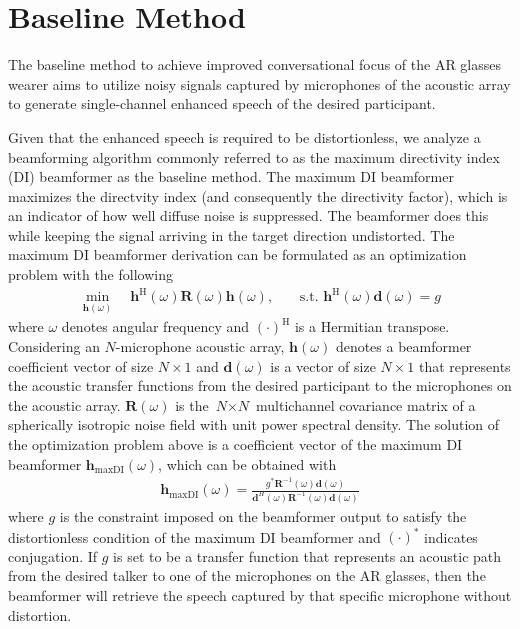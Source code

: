 \documentclass[journal]{IEEEtran}
\begin{document}
 \section{Baseline Method} \label{sec:BaselineMethod}

The baseline method to achieve improved conversational focus of the AR glasses wearer aims to utilize noisy signals captured by microphones of the acoustic array to generate single-channel enhanced speech of the desired participant.


Given that the enhanced speech is required to be distortionless,
we analyze a beamforming algorithm commonly referred to as the maximum directivity index (DI) beamformer as the baseline method.
The maximum DI beamformer maximizes the directvity index (and consequently the directivity factor), which is an indicator of how well diffuse noise is suppressed.
The beamformer does this while keeping the signal arriving in the target direction undistorted.
The maximum DI beamformer derivation can be formulated as an optimization problem with the following
\begin{align}
\underset{\mathbf{h}(\omega)} {\min} \quad \mathbf{h}^{\mathrm{H}}(\omega) \mathbf{R}(\omega) \mathbf{h}(\omega) \text{,}
\qquad \text{s.t. }
\mathbf{h}^{\mathrm{H}}(\omega) \mathbf{d}(\omega) = g
\end{align}
where $\omega$ denotes angular frequency and $(\cdot)^{\mathrm{H}}$ is a Hermitian transpose.
Considering an $\textit{N}$-microphone acoustic array, $\mathbf{h}(\omega)$ denotes a beamformer coefficient vector of size $\textit{N} \times 1$ and $\mathbf{d}(\omega)$ is a vector of size $\textit{N} \times 1$ that represents the acoustic transfer functions from the desired participant to the microphones on the acoustic array.
$\mathbf{R}(\omega)$  is the $\textit{N} \times \textit{N}$ multichannel covariance matrix of a spherically isotropic noise field with unit power spectral density. The solution of the optimization problem above is a coefficient vector of the maximum DI beamformer $\mathbf{h}_{\mathrm{maxDI}}(\omega)$, which can be obtained with
\begin{align}
\mathbf{h}_{\mathrm{maxDI}}(\omega) =  \frac{g^{\ast} \mathbf{R}^{-1}(\omega) \mathbf{d}(\omega)}{\mathbf{d}^H(\omega)\mathbf{R}^{-1}(\omega)\mathbf{d}(\omega)}
\end{align}
where $g$ is the constraint imposed on the beamformer output to satisfy the distortionless condition of the maximum DI beamformer and $(\cdot)^{\ast}$ indicates conjugation. If $g$ is set to be a transfer function that represents an acoustic path from the desired talker to one of the microphones on the AR glasses, then the beamformer will retrieve the speech captured by that specific microphone without distortion.
\end{document}
